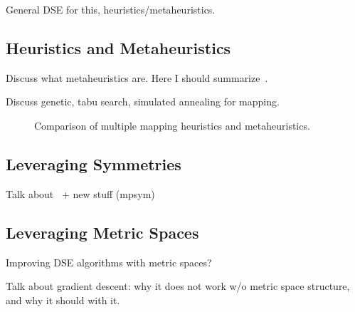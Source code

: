 General DSE for this, heuristics/metaheuristics.

\subsection{Heuristics and Metaheuristics}

Discuss what metaheuristics are.
Here I should summarize~\cite{goens_mcsoc16}.

Discuss genetic, tabu search, simulated annealing for mapping.

\begin{figure}[h]
	\centering
   \resizebox{0.95\textwidth}{!}{}
	\caption{Comparison of multiple mapping heuristics and metaheuristics.}
	\label{fig:metric_comparison}
\end{figure}

\subsection{Leveraging Symmetries}
Talk about~\cite{goens_taco17} + new stuff (mpsym)

\subsection{Leveraging Metric Spaces}
Improving DSE algorithms with metric spaces?

Talk about gradient descent: why it does not work w/o metric space structure, and why it should with it.
